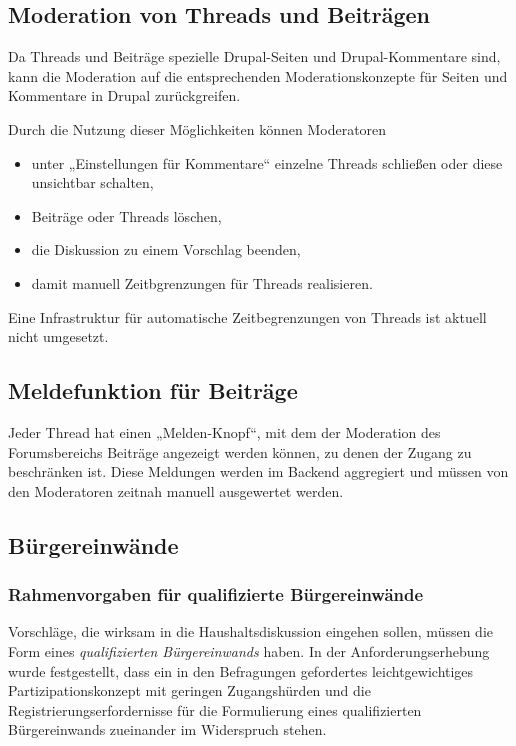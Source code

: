 \documentclass[11pt,a4paper,twoside]{article}
\begin{document}
\subsection*{Moderation von Threads und Beiträgen} 

Da Threads und Beiträge spezielle Drupal-Seiten und Drupal-Kommentare sind,
kann die Moderation auf die entsprechenden Moderationskonzepte für Seiten und
Kommentare in Drupal zurückgreifen. 

Durch die Nutzung dieser Möglichkeiten können Moderatoren
\begin{itemize}\itemsep0pt
\item unter „Einstellungen für Kommentare“ einzelne Threads schließen oder
  diese unsichtbar schalten,
\item Beiträge oder Threads löschen,
\item die Diskussion zu einem Vorschlag beenden,
\item damit manuell Zeitbgrenzungen für Threads realisieren. 
\end{itemize}

Eine Infrastruktur für automatische Zeitbegrenzungen von Threads ist aktuell
nicht umgesetzt.

\subsection*{Meldefunktion für Beiträge} 

Jeder Thread hat einen „Melden-Knopf“, mit dem der Moderation des
Forumsbereichs Beiträge angezeigt werden können, zu denen der Zugang zu
beschränken ist.  Diese Meldungen werden im Backend aggregiert und müssen von
den Moderatoren zeitnah manuell ausgewertet werden.

\subsection{Bürgereinwände} 

\subsubsection*{Rahmenvorgaben für qualifizierte Bürgereinwände} 

Vorschläge, die wirksam in die Haushaltsdiskussion eingehen sollen, müssen die
Form eines \emph{qualifizierten Bürgereinwands} haben. In der
Anforderungserhebung wurde festgestellt, dass ein in den Befragungen
gefordertes leichtgewichtiges Partizipationskonzept mit geringen Zugangshürden
und die Registrierungserfordernisse für die Formulierung eines qualifizierten
Bürgereinwands zueinander im Widerspruch stehen. 
\end{document}

